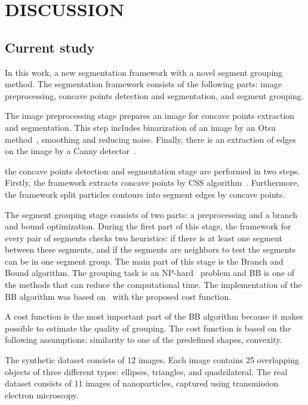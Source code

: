 \documentclass{lutmscthesis}[2010/09/22]
\begin{document}
\section{DISCUSSION}
\label{sec:discussion}

\subsection{Current study}


In this work, a new segmentation framework with a novel segment grouping method. The segmentation framework consists of the following parts: image preprocessing, concave points detection and segmentation, and segment grouping.

The image preprocessing stage prepares an image for concave points extraction and segmentation. This step includes binarization of an image by an Otsu method~\cite{otsu}, smoothing and reducing noise. Finally, there is an extraction of edges on the image by a Canny detector~\cite{Canny}. 

the concave points detection and segmentation stage are performed in two steps. Firstly, the framework extracts concave points by CSS algorithm~\cite{CSS}. Furthermore, the framework split particles contours into segment edges by concave points. 

The segment grouping stage consists of two parts: a preprocessing and a branch and bound optimization. During the first part of this stage, the framework for every pair of segments checks two heuristics: if there is at least one segment between these segments, and if the segments are neighbors to test the segments can be in one segment group. The main part of this stage is the Branch and Bound algorithm. The grouping task is an NP-hard~\cite{zafari-bb} problem and BB is one of the methods that can reduce the computational time. The implementation of the BB algorithm was based on~\cite{zafari-bb} with the proposed cost function.

A cost function is the most important part of the BB algorithm because it makes possible to estimate the quality of grouping. The cost function is based on the following assumptions: similarity to one of the predefined shapes, convexity.

The synthetic dataset consists of 12 images. Each image contains 25 overlapping objects of three different types: ellipses, triangles, and quadrilateral. The real dataset consists of 11 images of nanoparticles, captured
using transmission electron microscopy.
\end{document}
